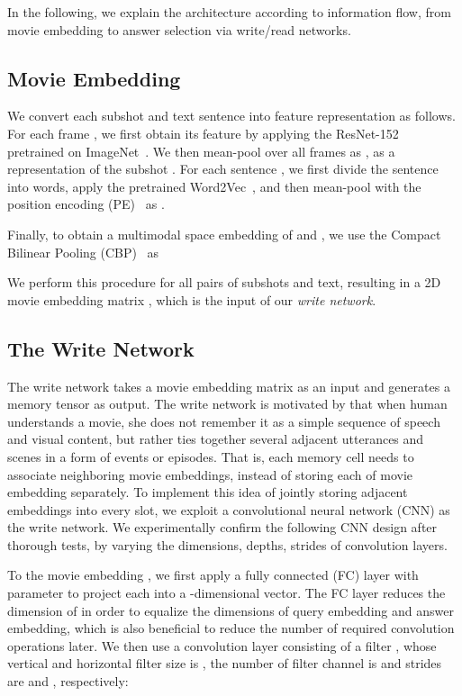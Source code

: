 \documentclass[10pt,twocolumn,letterpaper]{article}
\theoremstyle{nonumberplain}
\begin{document}
In the following, we explain the architecture according to information flow, from movie embedding to answer selection via write/read networks. 

\subsection{Movie Embedding}
\label{sec:movie_embedding}

We convert each subshot   and text sentence  into feature representation as follows. For each frame , we first obtain its feature  by applying the ResNet-152~\cite{he2016deep} pretrained on ImageNet~\cite{deng2009imagenet}. 
We then mean-pool over all frames as , as a representation of the subshot .
For each sentence , we first divide the sentence into words, apply the pretrained Word2Vec~\cite{mikolov2013distributed}, and then mean-pool with the position encoding (PE)~\cite{sukhbaatar2015end} as .

Finally, to obtain a multimodal space embedding of  and , we use the Compact Bilinear Pooling (CBP)~\cite{fukui2016multimodal} as 

We perform this procedure for all  pairs of subshots and text, resulting in a 2D movie embedding matrix ,
which is the input of our \textit{write network}.

\subsection{The Write Network}
\label{sec:write_net}

The write network takes a movie embedding matrix  as an input 
and generates a memory tensor  as output. 
The write network is motivated by that when human understands a movie, she does not remember it as a simple sequence of speech and visual content, 
but rather ties together several adjacent utterances and scenes in a form of events or episodes.
That is, each memory cell needs to associate neighboring movie embeddings, instead of storing each of  movie embedding separately. 
To implement this idea of jointly storing adjacent embeddings into every slot, we exploit a convolutional neural network (CNN) as the write network. 
We experimentally confirm the following CNN design after thorough tests, by varying the dimensions, depths, strides of convolution layers. 

To the movie embedding , 
we first apply a fully connected (FC) layer with parameter  to project each  into a -dimensional vector.
The FC layer reduces the dimension of  in order to equalize the dimensions of query embedding and answer embedding, 
which is also beneficial to reduce the number of required convolution operations later.
We then use a convolution layer consisting of a filter , whose vertical and horizontal filter size is , the number of filter channel is  and strides are  and , respectively: 
\end{document}
